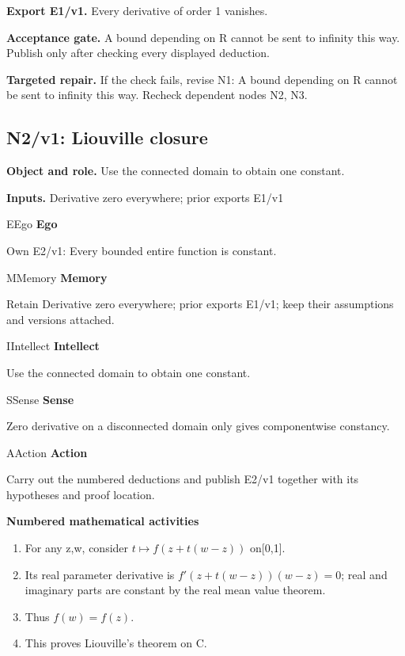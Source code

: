 \documentclass[preprint,12pt,aps,pra,showkeys,amsmath,amssymb,superscriptaddress,floatfix]{revtex4-2}
\theoremstyle{definition}
\theoremstyle{remark}
\newcommand{\mmfaculty}[3]{%
 \begin{mmfacultybox}{#1}{#2}
 {\sffamily\bfseries\color{MMBlue}#2}\par\smallskip #3
 \end{mmfacultybox}}
\newcommand{\field}[2]{\par\smallskip\noindent\textbf{#1.} #2\par}
\begin{document}
\field{Export E1/v1}{Every derivative of order 1 vanishes.}

\field{Acceptance gate}{A bound depending on R cannot be sent to infinity this way. Publish only
after checking every displayed deduction.}

\field{Targeted repair}{If the check fails, revise N1: A bound depending on R cannot be sent to
infinity this way. Recheck dependent nodes N2, N3.}

\clearpage

\subsection{N2/v1: Liouville closure}

\field{Object and role}{Use the connected domain to obtain one constant.}

\field{Inputs}{Derivative zero everywhere; prior exports E1/v1}

\mmfaculty{E}{Ego}{Own E2/v1: Every bounded entire function is constant.}

\mmfaculty{M}{Memory}{Retain Derivative zero everywhere; prior exports E1/v1; keep their
assumptions and versions attached.}

\mmfaculty{I}{Intellect}{Use the connected domain to obtain one constant.}

\mmfaculty{S}{Sense}{Zero derivative on a disconnected domain only gives componentwise
constancy.}

\mmfaculty{A}{Action}{Carry out the numbered deductions and publish E2/v1 together with its
hypotheses and proof location.}

\smallskip\noindent\textbf{Numbered mathematical activities}

\begin{enumerate}[label=N2.\arabic*,leftmargin=3.4em]

\item For any z,w, consider \(t\mapsto f(z+t(w-z))\) on{[}0,1{]}.

\item Its real parameter derivative is \(f'(z+t(w-z))(w-z)=0\); real and
imaginary parts are constant by the real mean value theorem.

\item Thus \(f(w)=f(z)\).

\item This proves Liouville's theorem on C.

\end{enumerate}
\end{document}
